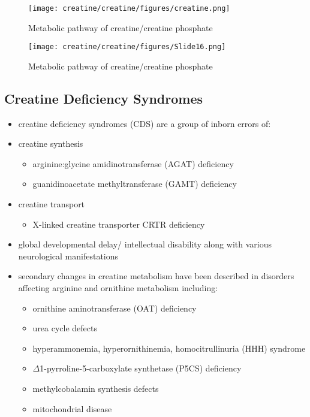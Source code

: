 \documentclass{scrartcl}
\begin{document}
\begin{figure}[htbp]
\centering
\texttt{[image: creatine/creatine/figures/creatine.png]}
\caption{\label{fig:orga64127b}Metabolic pathway of creatine/creatine phosphate}
\end{figure}

\begin{figure}[htbp]
\centering
\texttt{[image: creatine/creatine/figures/Slide16.png]}
\caption{\label{fig:org1af4f90}Metabolic pathway of creatine/creatine phosphate}
\end{figure}

\subsection{Creatine Deficiency Syndromes}
\label{sec:org9c744f0}
\begin{itemize}
\item creatine deficiency syndromes (CDS) are a group of inborn errors of:
\item creatine synthesis
\begin{itemize}
\item arginine:glycine amidinotransferase (AGAT) deficiency
\item guanidinoacetate methyltransferase (GAMT) deficiency
\end{itemize}
\item creatine transport
\begin{itemize}
\item X-linked creatine transporter CRTR deficiency
\end{itemize}
\item global developmental delay/ intellectual disability along with
various neurological manifestations

\item secondary changes in creatine metabolism have been described in
disorders affecting arginine and ornithine metabolism including:
\begin{itemize}
\item ornithine aminotransferase (OAT) deficiency
\item urea cycle defects
\item hyperammonemia, hyperornithinemia, homocitrullinuria (HHH) syndrome
\item \(\Delta\)1-pyrroline-5-carboxylate synthetase (P5CS) deficiency
\item methylcobalamin synthesis defects
\item mitochondrial disease
\end{itemize}
\end{itemize}
\end{document}
